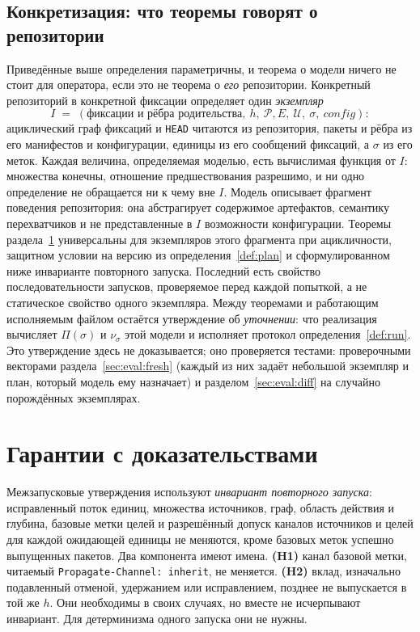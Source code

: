\documentclass[sigconf,nonacm]{acmart}
\theoremstyle{acmplain}
\theoremstyle{acmdefinition}
\theoremstyle{acmplain}
\newcommand{\code}[1]{\texttt{#1}}
\begin{document}
\subsection{Конкретизация: что теоремы говорят о репозитории}
\label{sec:model:inst}

Приведённые выше определения параметричны, и теорема о модели
ничего не стоит для оператора, если это не теорема о
\emph{его} репозитории. Конкретный репозиторий в конкретной фиксации определяет
один \emph{экземпляр}
\[
  I \;=\; (\text{фиксации и рёбра родительства},\ h,\
           \mathcal{P}, E,\ \mathcal{U},\ \sigma,\ \mathit{config}):
\]
ациклический граф фиксаций и \code{HEAD} читаются из репозитория,
пакеты и рёбра из его манифестов и конфигурации, единицы
из его сообщений фиксаций, а $\sigma$ из его меток. Каждая величина,
определяемая моделью, есть вычислимая функция от $I$: множества
конечны, отношение предшествования разрешимо, и ни одно определение не обращается ни к чему
вне $I$. Модель описывает фрагмент поведения репозитория: она абстрагирует
содержимое артефактов, семантику перехватчиков и не представленные в $I$
возможности конфигурации. Теоремы раздела~\ref{sec:guarantees} универсальны
для экземпляров этого фрагмента при ацикличности, защитном условии на версию
из определения~\ref{def:plan} и сформулированном ниже инварианте повторного
запуска. Последний есть свойство последовательности запусков, проверяемое
перед каждой попыткой, а не статическое свойство одного экземпляра. Между теоремами и работающим исполняемым файлом остаётся
утверждение об \emph{уточнении}: что реализация вычисляет
$\Pi(\sigma)$ и $\nu_\sigma$ этой модели и исполняет
протокол определения~\ref{def:run}. Это утверждение здесь не доказывается;
оно проверяется тестами: проверочными векторами раздела~\ref{sec:eval:fresh} (каждый
из них задаёт небольшой экземпляр и план, который модель ему назначает) и
разделом~\ref{sec:eval:diff} на случайно порождённых экземплярах.
\section{Гарантии с доказательствами}
\label{sec:guarantees}

Межзапусковые утверждения используют \emph{инвариант повторного запуска}:
исправленный поток единиц, множества источников, граф, область действия и
глубина, базовые метки целей и разрешённый допуск каналов источников и целей
для каждой ожидающей единицы не меняются, кроме базовых меток успешно
выпущенных пакетов. Два компонента имеют имена. \textbf{(H1)} канал базовой
метки, читаемый \code{Propagate-Channel: inherit}, не меняется.
\textbf{(H2)} вклад, изначально подавленный отменой, удержанием или
исправлением, позднее не выпускается в той же $h$. Они необходимы в своих
случаях, но вместе не исчерпывают инвариант. Для детерминизма одного запуска
они не нужны.
\end{document}

